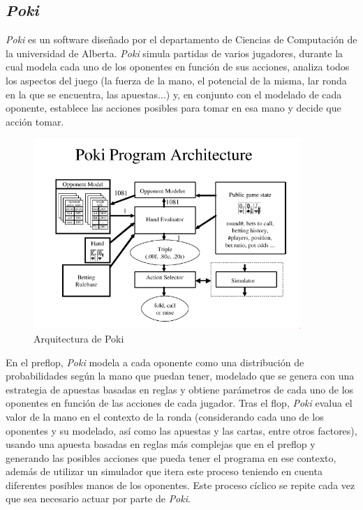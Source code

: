 \subsection{\textit{Poki}}

\textit{Poki} \cite{Billings} es un software diseñado por el departamento de Ciencias de Computación de la universidad de Alberta. \textit{Poki} simula partidas de varios jugadores, durante la cual modela cada uno de los oponentes en función de sus acciones, analiza todos los aspectos del juego (la fuerza de la mano, el potencial de la misma, lar ronda en la que se encuentra, las apuestas...) y, en conjunto con el modelado de cada oponente, establece las acciones posibles para tomar en esa mano y decide que acción tomar.

\begin{figure}[h]
\centering
\includegraphics[width=0.9\textwidth]{figuras/Poki.png}   
\caption{Arquitectura de Poki \cite{Billings}}
\label{fig:poki}
\end{figure}

En el preflop, \textit{Poki} modela a cada oponente como una distribución de probabilidades según la mano que puedan tener, modelado que se genera con una estrategia de apuestas basadas en reglas y obtiene parámetros de cada uno de los oponentes en función de las acciones de cada jugador. Tras el flop, \textit{Poki} evalua el valor de la mano en el contexto de la ronda (considerando cada uno de los oponentes y su modelado, así como las apuestas y las cartas, entre otros factores), usando una  apuesta basadas en reglas más complejas que en el preflop y generando las posibles acciones que pueda tener el programa en ese contexto, además de utilizar un simulador que itera este proceso teniendo en cuenta diferentes posibles manos de los oponentes. Este proceso cíclico se repite cada vez que sea necesario actuar por parte de \textit{Poki}.

